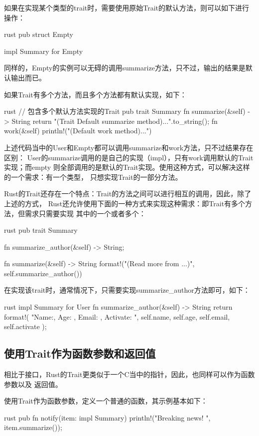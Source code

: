 如果在实现某个类型的trait时，需要使用原始Trait的默认方法，则可以如下进行操作：
\begin{code-block}{rust}
pub struct Empty {}

impl Summary for Empty {}
\end{code-block}
同样的，Empty的实例可以无碍的调用summarize方法，只不过，输出的结果是默认输出而已。

如果Trait有多个方法，而且多个方法都有默认实现，如下：
\begin{code-block}{rust}
// 包含多个默认方法实现的Trait
pub trait Summary {
    fn summarize(&self) -> String {
        return "(Trait Default summarize method)...".to_string();
    }
    fn work(&self) {
        println!("(Default work method)...")
    }
}
\end{code-block}

上述代码当中的User和Empty都可以调用summarize和work方法，只不过结果存在区别：
User的summarize调用的是自己的实现（impl），只有work调用默认的Trait实现；而empty
则全部调用的是默认的Trait实现。使用这种方式，可以解决这样的一个需求：有一个类型，
只想实现Trait的一部分方法。

Rust的Trait还存在一个特点：Trait的方法之间可以进行相互的调用，因此，除了上述的方式，
Rust还允许使用下面的一种方式来实现这种需求：即Trait有多个方法，但需求只需要实现
其中的一个或者多个：
\begin{code-block}{rust}
pub trait Summary {
    fn summarize_author(&self) -> String;

    fn summarize(&self) -> String {
        format!("(Read more from {}...)", self.summarize_author())
    }
}
\end{code-block}
在实现该trait时，通常情况下，只需要实现summarize\_author方法即可，如下：
\begin{code-block}{rust}
impl Summary for User {
    fn summarize_author(&self) -> String {
        return format!(
            "Name:{}, Age: {}, Email: {}, Activate: {}",
            self.name, self.age, self.email, self.activate
        );
    }
}
\end{code-block}

\subsection{使用Trait作为函数参数和返回值}
相比于接口，Rust的Trait更类似于一个C当中的指针，因此，也同样可以作为函数参数以及
返回值。

使用Trait作为函数参数，定义一个普通的函数，其示例基本如下：
\begin{code-block}{rust}
pub fn notify(item: impl Summary) {
    println!("Breaking news! {}", item.summarize());
}
\end{code-block}

